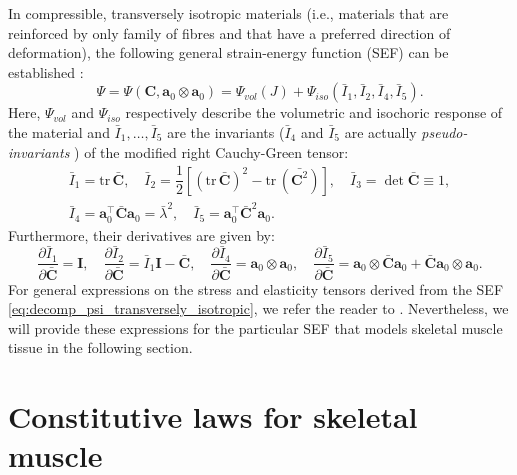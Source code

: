 \documentclass{sfuthesis}
\numberwithin{equation}{section}
\numberwithin{figure}{chapter}
\numberwithin{table}{chapter}
\theoremstyle{definition}
\def\*#1{{\mathbf{#1}}} %
\newcommand{\pder}[2]{\dfrac{\partial #1}{\partial #2}}
\newcommand{\I}{{\bar{I}}}
\newcommand{\T}{\top}
\begin{document}
In compressible, transversely isotropic materials (i.e., materials that are reinforced by only  family of fibres and that have a  preferred direction of deformation), the following general strain-energy function (SEF) can be established \cite{HolzapfelBook,Weiss1996}:
\begin{equation} \label{eq:decomp_psi_transversely_isotropic}
    \Psi = \Psi(\*C,\*a_0 \otimes \*a_0) = \Psi_{vol}(J) + \Psi_{iso}(\I_1, \I_2, \I_4, \I_5).
\end{equation}
Here, $\Psi_{vol}$ and $\Psi_{iso}$ respectively describe the volumetric and isochoric response of the material and $\I_1, \dots, \I_5$ are the invariants ($\I_4$ and $\I_5$ are actually \textit{pseudo-invariants} \cite{HolzapfelBook}) of the modified right Cauchy-Green tensor:
\begin{equation}
    \begin{gathered}
\I_1 = \mathrm{tr} \, \bar{\*C}, \quad \I_2 = \dfrac{1}{2}\left[ (\mathrm{tr} \, \bar{\*C})^2 - \mathrm{tr} \, (\bar{\*C^2}) \right], \quad \I_3 = \det \bar{\*C} \equiv 1, \\[0.5em]
\I_4 = \*a_0^\T \bar{\*C} \*a_0 = \bar{\lambda}^2, \quad \I_5 = \*a_0^\T \bar{\*C}^2 \*a_0.
    \end{gathered}
\end{equation}
Furthermore, their derivatives are given by:
\begin{equation} \label{eq:derivatives_invariants}
    \pder{\I_1}{\bar{\*C}} = \*I, \quad \pder{\I_2}{\bar{\*C}} = \I_1 \*I - \bar{\*C}, \quad \pder{\I_4}{\bar{\*C}} = \*a_0 \otimes \*a_0, \quad \pder{\I_5}{\bar{\*C}} = \*a_0 \otimes \bar{\*C}\*a_0 + \bar{\*C}\*a_0 \otimes \*a_0.
\end{equation}
For general expressions on the stress and elasticity tensors derived from the SEF \eqref{eq:decomp_psi_transversely_isotropic}, we refer the reader to \cite{Weiss1996}. Nevertheless, we will provide these expressions for the particular SEF that models skeletal muscle tissue in the following section.

\section{Constitutive laws for skeletal muscle}
\end{document}

